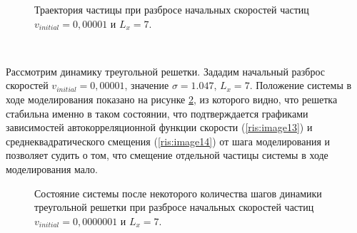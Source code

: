 \documentclass[14pt,a4paper,report]{ncc}
\begin{document}
\begin{figure}[]
\caption{Траектория частицы при разбросе начальных скоростей частиц $v_{initial} = 0,00001 $ и  $L_x=7$.}
\label{ris:image11}
\end{figure}
\



Рассмотрим динамику треугольной решетки. Зададим начальный разброс скоростей  $v_{initial} = 0,00001 $, значение $\sigma = 1.047$, $L_x = 7$. Положение системы в ходе моделирования показано на рисунке \ref{ris:image12}, из которого видно, что решетка стабильна именно в таком состоянии, что подтверждается графиками зависимостей автокорреляционной функции скорости (\ref{ris:image13}) и среднеквадратического смещения (\ref{ris:image14}) от шага моделирования и позволяет судить о том, что смещение отдельной частицы системы в ходе моделирования мало.
\

\begin{figure}[]
\caption{Состояние системы после некоторого количества шагов динамики треугольной решетки при разбросе начальных скоростей частиц $v_{initial} = 0,0000001 $ и   $L_x=7$.}
\label{ris:image12}
\end{figure}
\
\end{document}
